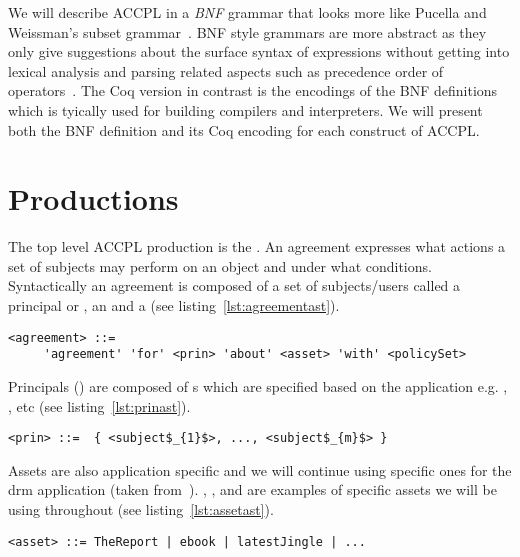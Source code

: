 We will describe \ac{ACCPL} in a \emph{BNF} grammar that looks more like Pucella and Weissman's subset grammar~\cite{pucella2006}. BNF style grammars are more abstract as they only give suggestions about the surface syntax of expressions without getting into lexical analysis and parsing related aspects such as precedence order of operators~\cite{piercesf2011}. The Coq version in contrast is the encodings of the BNF definitions which is tyically used for building compilers and interpreters. We will present both the BNF definition and its Coq encoding for each construct of \ac{ACCPL}. 


\section{Productions} \label{sec:productionast}

The top level \ac{ACCPL} production is the . An agreement expresses what actions a set of subjects may perform on an object and under what conditions. Syntactically an agreement is composed of a set of subjects/users called a principal or , an  and a  (see listing~\ref{lst:agreementast}).

\lstset{language=AST}
\begin{minipage}[c]{0.95\textwidth}
\begin{lstlisting}[frame=single, caption={agreement},label={lst:agreementast}]
<agreement> ::= 
     'agreement' 'for' <prin> 'about' <asset> 'with' <policySet> 
\end{lstlisting}
\end{minipage} 

Principals () are composed of s which are specified based on the application e.g. , , etc (see listing~\ref{lst:prinast}).

\lstset{mathescape, language=AST}  
\begin{lstlisting}[frame=single, caption={prin},label={lst:prinast}]
<prin> ::=  { <subject$_{1}$>, ..., <subject$_{m}$> }
\end{lstlisting}

Assets are also application specific and we will continue using specific ones for the \ac{drm} application (taken from~\cite{pucella2006}). , , and  are examples of specific assets we will be using throughout (see listing~\ref{lst:assetast}). 

\lstset{mathescape, language=AST}  
\begin{lstlisting}[frame=single, caption={asset},label={lst:assetast}]
<asset> ::= TheReport | ebook | latestJingle | ...
\end{lstlisting}

